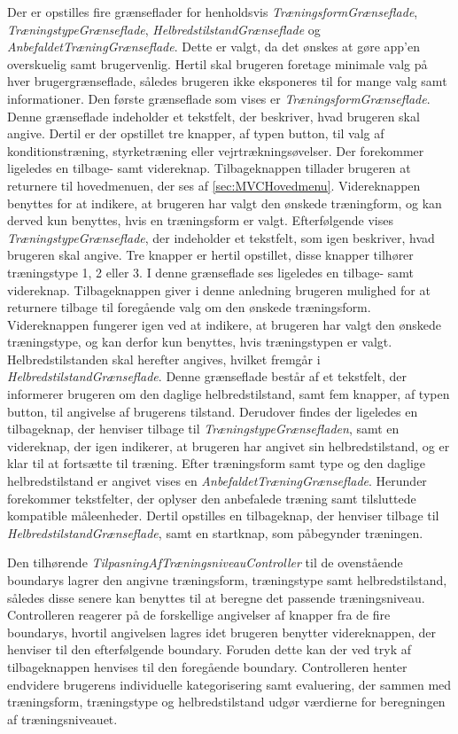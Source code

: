 Der er opstilles fire grænseflader for henholdsvis \textit{TræningsformGrænseflade}, \textit{TræningstypeGrænseflade}, \textit{HelbredstilstandGrænseflade} og \textit{AnbefaldetTræningGrænseflade}. Dette er valgt, da det ønskes at gøre app’en overskuelig samt brugervenlig. Hertil skal brugeren foretage minimale valg på hver brugergrænseflade, således brugeren ikke eksponeres til for mange valg samt informationer. 
Den første grænseflade som vises er \textit{TræningsformGrænseflade}. Denne grænseflade indeholder et tekstfelt, der beskriver, hvad brugeren skal angive. Dertil er der opstillet tre knapper, af typen button, til valg af konditionstræning, styrketræning eller vejrtrækningsøvelser. Der forekommer ligeledes en tilbage- samt videreknap. Tilbageknappen tillader brugeren at returnere til hovedmenuen, der ses af \autoref{sec:MVCHovedmenu}. Videreknappen benyttes for at indikere, at brugeren har valgt den ønskede træningform, og kan derved kun benyttes, hvis en træningsform er valgt. 
Efterfølgende vises \textit{TræningstypeGrænseflade}, der indeholder et tekstfelt, som igen beskriver, hvad brugeren skal angive. Tre knapper er hertil opstillet, disse knapper tilhører træningstype 1, 2 eller 3. I denne grænseflade ses ligeledes en tilbage- samt videreknap. Tilbageknappen giver i denne anledning brugeren mulighed for at returnere tilbage til  foregående valg om den ønskede træningsform. Videreknappen fungerer igen ved at indikere, at brugeren har valgt den ønskede træningstype, og kan derfor kun benyttes, hvis træningstypen er valgt. 
Helbredstilstanden skal herefter angives, hvilket fremgår i \textit{HelbredstilstandGrænseflade}. Denne grænseflade består af et tekstfelt, der informerer brugeren om den daglige helbredstilstand, samt fem knapper, af typen button, til angivelse af brugerens tilstand. Derudover findes der ligeledes en tilbageknap, der henviser tilbage til \textit{TræningstypeGrænsefladen}, samt en videreknap, der igen indikerer, at brugeren har angivet sin helbredstilstand, og er klar til at fortsætte til træning. 
Efter træningsform samt type og den daglige helbredstilstand er angivet vises en \textit{AnbefaldetTræningGrænseflade}. Herunder forekommer tekstfelter, der oplyser den anbefalede træning samt tilsluttede kompatible måleenheder. Dertil opstilles en tilbageknap, der henviser tilbage til \textit{HelbredstilstandGrænseflade}, samt en startknap, som påbegynder træningen. 

Den tilhørende \textit{TilpasningAfTræningsniveauController} til de ovenstående boundarys lagrer den angivne træningsform, træningstype samt helbredstilstand, således disse senere kan benyttes til at beregne det passende træningsniveau. Controlleren reagerer på de forskellige angivelser af knapper fra de fire boundarys, hvortil angivelsen lagres idet brugeren benytter videreknappen, der henviser til den efterfølgende boundary. Foruden dette kan der ved tryk af tilbageknappen henvises til den foregående boundary. 
Controlleren henter endvidere brugerens individuelle kategorisering samt evaluering, der sammen med træningsform, træningstype og helbredstilstand udgør værdierne for beregningen af træningsniveauet. 

